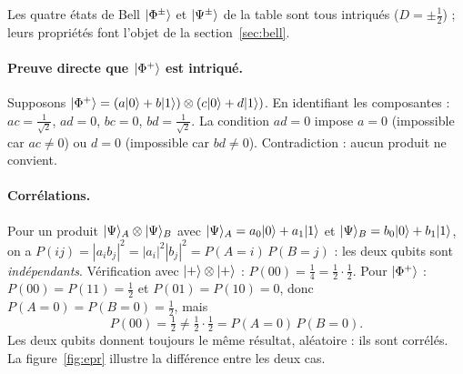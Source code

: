Les quatre états de Bell $|\Phi^\pm\rangle$ et $|\Psi^\pm\rangle$ de la table sont tous intriqués
($D=\pm\frac12$) ; leurs propriétés font l'objet de la section~\ref{sec:bell}.

\paragraph{Preuve directe que $|\Phi^+\rangle$ est intriqué.} Supposons
$|\Phi^+\rangle=(a|0\rangle+b|1\rangle)\otimes(c|0\rangle+d|1\rangle)$. En identifiant les
composantes : $ac=\frac{1}{\sqrt2}$, $ad=0$, $bc=0$, $bd=\frac{1}{\sqrt2}$. La condition
$ad=0$ impose $a=0$ (impossible car $ac\neq0$) ou $d=0$ (impossible car $bd\neq0$).
Contradiction : aucun produit ne convient.

\paragraph{Corrélations.} Pour un produit $|\Psi\rangle_A\otimes|\Psi\rangle_B$ avec
$|\Psi\rangle_A=a_0|0\rangle+a_1|1\rangle$ et $|\Psi\rangle_B=b_0|0\rangle+b_1|1\rangle$, on a
$P(ij)=|a_ib_j|^2=|a_i|^2|b_j|^2=P(A{=}i)\,P(B{=}j)$ : les deux qubits sont
\emph{indépendants}. Vérification avec $|+\rangle\otimes|+\rangle$ : $P(00)=\frac14=\frac12\cdot\frac12$.
Pour $|\Phi^+\rangle$ : $P(00)=P(11)=\frac12$ et $P(01)=P(10)=0$, donc
$P(A{=}0)=P(B{=}0)=\frac12$, mais
\[
  P(00)=\tfrac12\neq\tfrac12\cdot\tfrac12=P(A{=}0)\,P(B{=}0) .
\]
Les deux qubits donnent toujours le même résultat, aléatoire : ils sont corrélés.
La figure~\ref{fig:epr} illustre la différence entre les deux cas.

